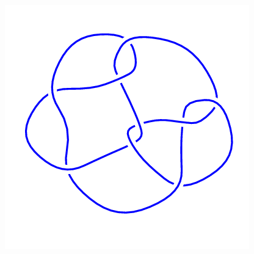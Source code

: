 \begin{figure}[H]
\begin{minipage}[b]{.18\linewidth}
    \end{minipage}
    \begin{minipage}[b]{.18\linewidth}
        \centering
        \includegraphics[width=\linewidth]{../data/9_25.png}
    \end{minipage}
\end{figure}
